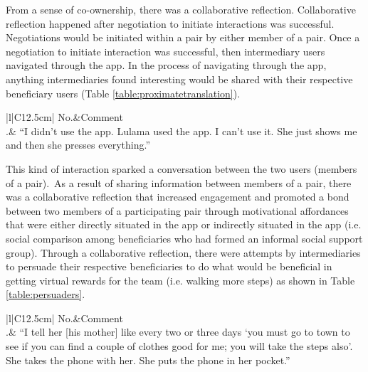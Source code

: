 From a sense of co-ownership, there was a collaborative reflection. Collaborative reflection happened after negotiation to initiate interactions was successful. Negotiations would be initiated within a pair by either member of a pair. Once a negotiation to initiate interaction was successful, then intermediary users navigated through the app. In the process of navigating through the app, anything intermediaries found interesting would be shared with their respective beneficiary users (Table \ref{table:proximatetranslation}).

\begin{table}[h!]
\renewcommand{\baselinestretch}{1.5}
  \begin{center}
    \caption{Excerpt: an example of how intermediaries enabled proximate translation of intents to interact with the app.}
    \label{table:proximatetranslation}
	\begin{tabular}{|l|C{12.5cm}|}
		\hline
		No.&Comment\\
		.& {``I didn't use the app. Lulama used the app. I can't use it. She just shows me and then she presses everything.''} \\
		\hline
	\end{tabular}
  \end{center}
\end{table} 

This kind of interaction sparked a conversation between the two users (members of a pair).~As a result of sharing information between members of a pair, there was a collaborative reflection that increased engagement and promoted a bond between two members of a participating pair through motivational affordances that were either directly situated in the app or indirectly situated in the app (i.e. social comparison among beneficiaries who had formed an informal social support group). Through a collaborative reflection, there were attempts by intermediaries to  persuade their respective beneficiaries to do what would be beneficial in getting virtual rewards for the team (i.e. walking more steps) as shown in Table \ref{table:persuaders}.

\begin{table}[h!]
\renewcommand{\baselinestretch}{1.5}
  \begin{center}
    \caption{Excerpt: an example of how intermediaries posed as persuaders for their beneficiaries.}
    \label{table:persuaders}
	\begin{tabular}{|l|C{12.5cm}|}
		\hline
		No.&Comment\\
		.& {``I tell her [his mother] like every two or three days `you must go to town to see if you can find a couple of clothes good for me; you will take the steps also'. She takes the phone with her. She puts the phone in her pocket.''}\\
		\hline
	\end{tabular}
  \end{center}
\end{table}

